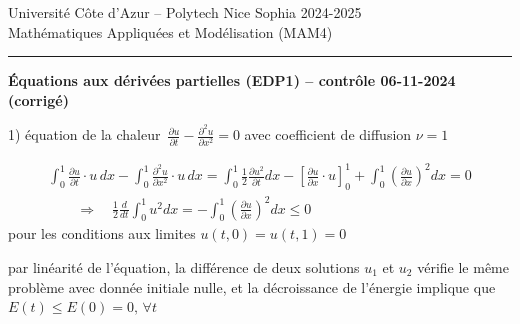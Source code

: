\documentclass[12pt,a4paper]{article}
\begin{document}
\noindent Universit\'e C\^ote d'Azur -- Polytech Nice Sophia 2024-2025\\
\noindent Math\'ematiques Appliqu\'ees et Mod\'elisation (MAM4)\\

\hrule \bigskip

\begin{center}
{\bf \'Equations aux d\'eriv\'ees partielles (EDP1) -- contr\^ole 06-11-2024 (corrig\'e)}
\end{center}

\bigskip

1) \'equation de la chaleur $\,\displaystyle \frac{\partial u}{\partial t} - \frac{\partial^2 u}{\partial x^2} = 0$ avec coefficient de diffusion $\nu =1$

$$
\begin{array}{l}
\displaystyle \int_0^1 \frac{\partial u}{\partial t} \cdot u \,dx - \int_0^1 \frac{\partial^2 u}{\partial x^2} \cdot u \,dx = \int_0^1 \frac12 \frac{\partial u^2}{\partial t} dx - \left[ \frac{\partial u}{\partial x} \cdot u \right]_0^1 + \int_0^1 \left( \frac{\partial u}{\partial x} \right)^{\!\!2} dx = 0 \\[2ex]
\qquad \displaystyle \Longrightarrow \quad \frac12 \frac{d}{d t} \int_0^1 u^2 dx = - \int_0^1 \left( \frac{\partial u}{\partial x} \right)^{\!\!2} dx \leq 0
\end{array}
$$
pour les conditions aux limites $u(t,0)=u(t,1)=0$ %

par lin\'earit\'e de l'\'equation, la diff\'erence de deux solutions $u_1$ et $u_2$ v\'erifie le m\^eme probl\`eme avec donn\'ee initiale nulle, et la d\'ecroissance de l'\'energie implique que $E(t)\leq E(0)=0,\,\forall t$\\

\end{document}
